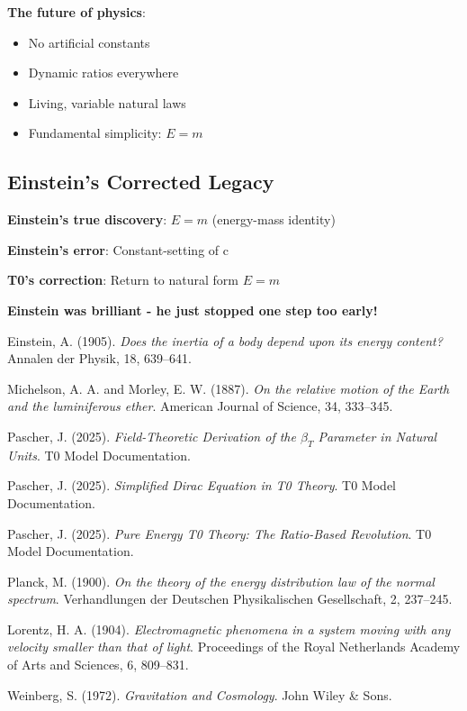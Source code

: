\documentclass[12pt,a4paper]{article}
\begin{document}
	\textbf{The future of physics}:
	\begin{itemize}
		\item No artificial constants
		\item Dynamic ratios everywhere
		\item Living, variable natural laws
		\item Fundamental simplicity: $E = m$
	\end{itemize}
	
	\subsection{Einstein's Corrected Legacy}
	
	\textbf{Einstein's true discovery}: $E = m$ (energy-mass identity)
	
	\textbf{Einstein's error}: Constant-setting of c
	
	\textbf{T0's correction}: Return to natural form $E = m$
	
	\textbf{Einstein was brilliant - he just stopped one step too early!}
	\begin{thebibliography}{99}
		Einstein, A. (1905). \textit{Does the inertia of a body depend upon its energy content?} Annalen der Physik, 18, 639--641.
		
		Michelson, A. A. and Morley, E. W. (1887). \textit{On the relative motion of the Earth and the luminiferous ether}. American Journal of Science, 34, 333--345.
		
		Pascher, J. (2025). \textit{Field-Theoretic Derivation of the $\beta_T$ Parameter in Natural Units}. T0 Model Documentation.
		
		Pascher, J. (2025). \textit{Simplified Dirac Equation in T0 Theory}. T0 Model Documentation.
		
		Pascher, J. (2025). \textit{Pure Energy T0 Theory: The Ratio-Based Revolution}. T0 Model Documentation.
		
		Planck, M. (1900). \textit{On the theory of the energy distribution law of the normal spectrum}. Verhandlungen der Deutschen Physikalischen Gesellschaft, 2, 237--245.
		
		Lorentz, H. A. (1904). \textit{Electromagnetic phenomena in a system moving with any velocity smaller than that of light}. Proceedings of the Royal Netherlands Academy of Arts and Sciences, 6, 809--831.
		
		Weinberg, S. (1972). \textit{Gravitation and Cosmology}. John Wiley \& Sons.
	\end{thebibliography}
\end{document}
